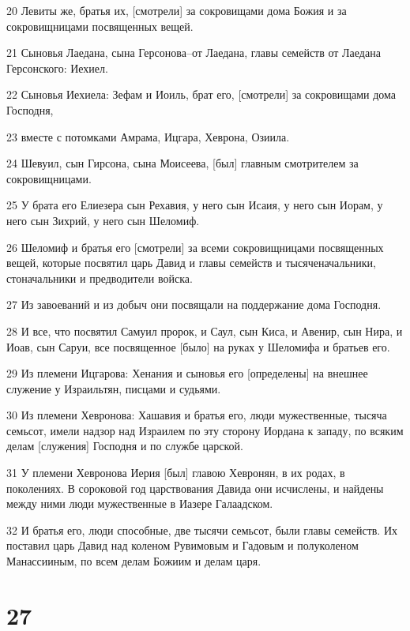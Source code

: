 \par 20 Левиты же, братья их, [смотрели] за сокровищами дома Божия и за сокровищницами посвященных вещей.
\par 21 Сыновья Лаедана, сына Герсонова--от Лаедана, главы семейств от Лаедана Герсонского: Иехиел.
\par 22 Сыновья Иехиела: Зефам и Иоиль, брат его, [смотрели] за сокровищами дома Господня,
\par 23 вместе с потомками Амрама, Ицгара, Хеврона, Озиила.
\par 24 Шевуил, сын Гирсона, сына Моисеева, [был] главным смотрителем за сокровищницами.
\par 25 У брата его Елиезера сын Рехавия, у него сын Исаия, у него сын Иорам, у него сын Зихрий, у него сын Шеломиф.
\par 26 Шеломиф и братья его [смотрели] за всеми сокровищницами посвященных вещей, которые посвятил царь Давид и главы семейств и тысяченачальники, стоначальники и предводители войска.
\par 27 Из завоеваний и из добыч они посвящали на поддержание дома Господня.
\par 28 И все, что посвятил Самуил пророк, и Саул, сын Киса, и Авенир, сын Нира, и Иоав, сын Саруи, все посвященное [было] на руках у Шеломифа и братьев его.
\par 29 Из племени Ицгарова: Хенания и сыновья его [определены] на внешнее служение у Израильтян, писцами и судьями.
\par 30 Из племени Хевронова: Хашавия и братья его, люди мужественные, тысяча семьсот, имели надзор над Израилем по эту сторону Иордана к западу, по всяким делам [служения] Господня и по службе царской.
\par 31 У племени Хевронова Иерия [был] главою Хевронян, в их родах, в поколениях. В сороковой год царствования Давида они исчислены, и найдены между ними люди мужественные в Иазере Галаадском.
\par 32 И братья его, люди способные, две тысячи семьсот, были главы семейств. Их поставил царь Давид над коленом Рувимовым и Гадовым и полуколеном Манассииным, по всем делам Божиим и делам царя.

\chapter{27}

